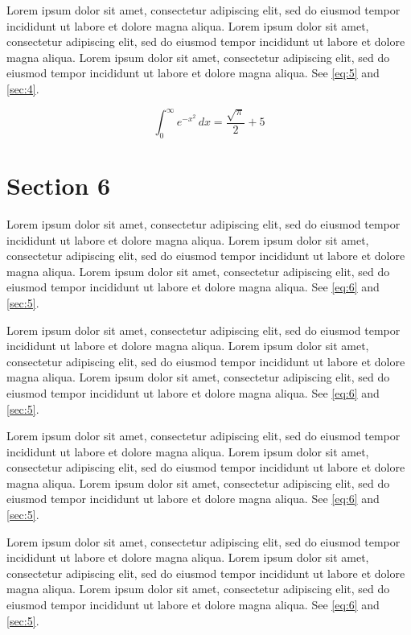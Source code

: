 \documentclass[11pt]{article}
\begin{document}
Lorem ipsum dolor sit amet, consectetur adipiscing elit, sed do eiusmod tempor incididunt ut labore et dolore magna aliqua. Lorem ipsum dolor sit amet, consectetur adipiscing elit, sed do eiusmod tempor incididunt ut labore et dolore magna aliqua. Lorem ipsum dolor sit amet, consectetur adipiscing elit, sed do eiusmod tempor incididunt ut labore et dolore magna aliqua. See \cref{eq:5} and \cref{sec:4}.

\begin{equation}\label{eq:5} \int_0^\infty e^{-x^2}\,dx = \frac{\sqrt{\pi}}{2} + 5\end{equation}
\section{Section 6}\label{sec:6}
Lorem ipsum dolor sit amet, consectetur adipiscing elit, sed do eiusmod tempor incididunt ut labore et dolore magna aliqua. Lorem ipsum dolor sit amet, consectetur adipiscing elit, sed do eiusmod tempor incididunt ut labore et dolore magna aliqua. Lorem ipsum dolor sit amet, consectetur adipiscing elit, sed do eiusmod tempor incididunt ut labore et dolore magna aliqua. See \cref{eq:6} and \cref{sec:5}.

Lorem ipsum dolor sit amet, consectetur adipiscing elit, sed do eiusmod tempor incididunt ut labore et dolore magna aliqua. Lorem ipsum dolor sit amet, consectetur adipiscing elit, sed do eiusmod tempor incididunt ut labore et dolore magna aliqua. Lorem ipsum dolor sit amet, consectetur adipiscing elit, sed do eiusmod tempor incididunt ut labore et dolore magna aliqua. See \cref{eq:6} and \cref{sec:5}.

Lorem ipsum dolor sit amet, consectetur adipiscing elit, sed do eiusmod tempor incididunt ut labore et dolore magna aliqua. Lorem ipsum dolor sit amet, consectetur adipiscing elit, sed do eiusmod tempor incididunt ut labore et dolore magna aliqua. Lorem ipsum dolor sit amet, consectetur adipiscing elit, sed do eiusmod tempor incididunt ut labore et dolore magna aliqua. See \cref{eq:6} and \cref{sec:5}.

Lorem ipsum dolor sit amet, consectetur adipiscing elit, sed do eiusmod tempor incididunt ut labore et dolore magna aliqua. Lorem ipsum dolor sit amet, consectetur adipiscing elit, sed do eiusmod tempor incididunt ut labore et dolore magna aliqua. Lorem ipsum dolor sit amet, consectetur adipiscing elit, sed do eiusmod tempor incididunt ut labore et dolore magna aliqua. See \cref{eq:6} and \cref{sec:5}.
\end{document}
